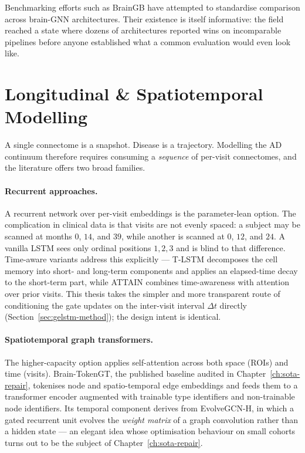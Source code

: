 Benchmarking efforts such as BrainGB have attempted to standardise comparison across
brain-GNN architectures. Their existence is itself informative: the field reached a state
where dozens of architectures reported wins on incomparable pipelines before anyone
established what a common evaluation would even look like.

\section{Longitudinal \& Spatiotemporal Modelling}
\label{sec:longitudinal}

A single connectome is a snapshot. Disease is a trajectory. Modelling the AD continuum
therefore requires consuming a \emph{sequence} of per-visit connectomes, and the
literature offers two broad families.

\paragraph{Recurrent approaches.} A recurrent network over per-visit embeddings is the
parameter-lean option. The complication in clinical data is that visits are not evenly
spaced: a subject may be scanned at months $0$, $14$, and $39$, while another is scanned
at $0$, $12$, and $24$. A vanilla LSTM sees only ordinal positions $1, 2, 3$ and is blind
to that difference. Time-aware variants address this explicitly --- T-LSTM decomposes the
cell memory into short- and long-term components and applies an elapsed-time decay to the
short-term part, while ATTAIN combines time-awareness with attention over prior visits.
This thesis takes the simpler and more transparent route of conditioning the gate updates
on the inter-visit interval $\Delta t$ directly (Section~\ref{sec:gelstm-method}); the
design intent is identical.

\paragraph{Spatiotemporal graph transformers.} The higher-capacity option applies
self-attention across both space (ROIs) and time (visits). Brain-TokenGT, the published
baseline audited in Chapter~\ref{ch:sota-repair}, tokenises node and spatio-temporal edge
embeddings and feeds them to a transformer encoder augmented with trainable type
identifiers and non-trainable node identifiers. Its temporal component derives from
EvolveGCN-H, in which a gated recurrent unit evolves the \emph{weight matrix} of a graph
convolution rather than a hidden state --- an elegant idea whose optimisation behaviour on
small cohorts turns out to be the subject of Chapter~\ref{ch:sota-repair}.

